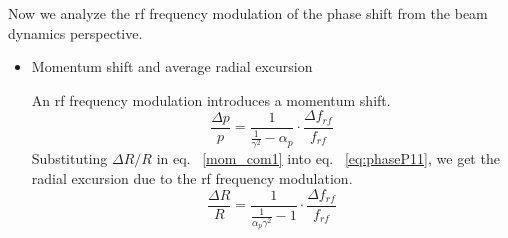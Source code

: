 Now we analyze the rf frequency modulation of the phase shift from the beam dynamics perspective.
\begin{itemize}

	\item Momentum shift and average radial excursion

An rf frequency modulation introduces a momentum shift. 
\begin{equation}
\frac{\Delta{p}}{p}  = \frac{1}{\frac{1}{\gamma^2}-\alpha_{\mathit{p}}}\cdot \frac{\Delta f_{\mathit{rf}}}{f_{\mathit{rf}}}
\label{eq:phaseP11}
\end{equation}
Substituting ${\Delta R}/{R}$ in eq. ~\ref{mom_com1} into eq. ~\ref{eq:phaseP11}, we get the radial excursion due to the rf frequency modulation.
\begin{equation}
\label{eq:phaseR}
\frac{\Delta{R}}{R} =\frac{1}{{\frac{1}{\alpha_{\mathit{p}}\gamma^2}-1}}\cdot\frac{\Delta f_{\mathit{rf}}}{f_{\mathit{rf}}}
\end{equation}


\end{itemize}
